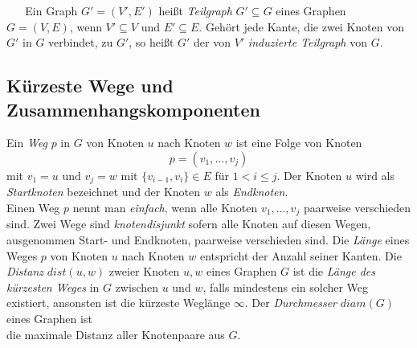 ~\linebreak
\vspace{-2mm}
~\linebreak
Ein Graph $G'=(V',E')$ heißt \emph{Teilgraph} $G'\subseteq G$ eines Graphen $G=(V,E)$, wenn $V'\subseteq V$ und $E'\subseteq E$. Gehört jede Kante, die zwei Knoten von $G'$ in $G$ verbindet, zu $G'$, so heißt $G'$ der von $V'$ \emph{induzierte Teilgraph} von $G$. 
\subsection{Kürzeste Wege und Zusammenhangskomponenten}
Ein \emph{Weg} $p$ in $G$ von Knoten $u$ nach Knoten $w$ ist eine Folge von Knoten $$p=(v_1,\ldots,v_j)$$ mit $v_1=u$ und $v_j=w$ mit $\{v_{i-1},v_i\}\in E$ für $1 <i \leq j$. Der Knoten $u$ wird als \emph{Startknoten} bezeichnet und der Knoten $w$ als \emph{Endknoten}.\\Einen Weg $p$ nennt man \emph{einfach}, wenn alle Knoten $v_1,\ldots,v_j$ paarweise verschieden sind. Zwei Wege sind \emph{knotendisjunkt} sofern alle Knoten auf diesen Wegen, ausgenommen Start- und Endknoten, paarweise verschieden sind. Die \emph{Länge} eines Weges $p$ von Knoten $u$ nach Knoten $w$ entspricht der Anzahl seiner Kanten.\vspace{-1mm}\newline\newline
Die \emph{Distanz} $dist(u,w)$ zweier Knoten $u,w$ eines Graphen $G$ ist die \emph{Länge des kürzesten Weges} in $G$ zwischen $u$ und $w$, falls mindestens ein solcher Weg existiert, ansonsten ist die kürzeste Weglänge $\infty$. Der \emph{Durchmesser} $diam(G)$ eines Graphen ist\\die maximale Distanz aller Knotenpaare aus $G$.

